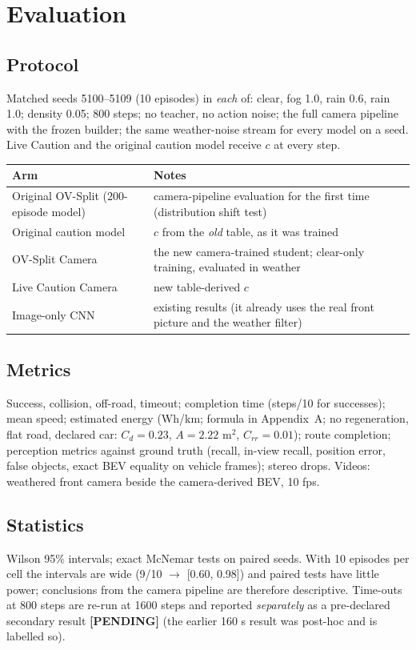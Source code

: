 \documentclass[11pt,a4paper]{article}
\newcommand{\tbd}{\textbf{[PENDING]}}
\begin{document}
\section{Evaluation}
\subsection{Protocol}
Matched seeds 5100--5109 (10 episodes) in \emph{each} of: clear, fog 1.0, rain 0.6, rain 1.0; density 0.05; 800 steps; no teacher, no action noise; the full camera pipeline with the frozen builder; the same weather-noise stream for every model on a seed. Live Caution and the original caution model receive $c$ at every step.
\begin{center}\small\begin{tabular}{@{}p{4.3cm}p{11cm}@{}}\toprule
Arm & Notes\\\midrule
Original OV-Split (200-episode model) & camera-pipeline evaluation for the first time (distribution shift test)\\
Original caution model & $c$ from the \emph{old} table, as it was trained\\
OV-Split Camera & the new camera-trained student; clear-only training, evaluated in weather\\
Live Caution Camera & new table-derived $c$\\
Image-only CNN & existing results (it already uses the real front picture and the weather filter)\\\bottomrule\end{tabular}\end{center}
\subsection{Metrics}
Success, collision, off-road, timeout; completion time (steps/10 for successes); mean speed; estimated energy (Wh/km; formula in Appendix~A; no regeneration, flat road, declared car: $C_d=0.23$, $A=2.22$ m$^2$, $C_{rr}=0.01$); route completion; perception metrics against ground truth (recall, in-view recall, position error, false objects, exact BEV equality on vehicle frames); stereo drops. Videos: weathered front camera beside the camera-derived BEV, 10 fps.
\subsection{Statistics}
Wilson 95\% intervals; exact McNemar tests on paired seeds. With 10 episodes per cell the intervals are wide (9/10 $\to$ [0.60, 0.98]) and paired tests have little power; conclusions from the camera pipeline are therefore descriptive. Time-outs at 800 steps are re-run at 1600 steps and reported \emph{separately} as a pre-declared secondary result \tbd{} (the earlier 160 s result was post-hoc and is labelled so).
\end{document}
